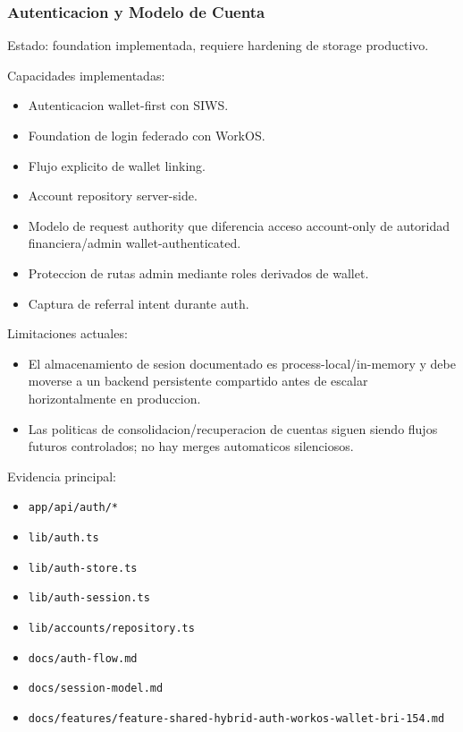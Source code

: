 \documentclass[
  10pt,
  letterpaper,
]{article}
\providecommand{\tightlist}{%
  \setlength{\itemsep}{0pt}\setlength{\parskip}{0pt}}
\let\oldtexttt\texttt
\renewcommand{\texttt}[1]{\oldtexttt{\small #1}}
\begin{document}
\subsubsection{Autenticacion y Modelo de
Cuenta}\label{autenticacion-y-modelo-de-cuenta}

Estado: foundation implementada, requiere hardening de storage
productivo.

Capacidades implementadas:

\begin{itemize}
\tightlist
\item
  Autenticacion wallet-first con SIWS.
\item
  Foundation de login federado con WorkOS.
\item
  Flujo explicito de wallet linking.
\item
  Account repository server-side.
\item
  Modelo de request authority que diferencia acceso account-only de
  autoridad financiera/admin wallet-authenticated.
\item
  Proteccion de rutas admin mediante roles derivados de wallet.
\item
  Captura de referral intent durante auth.
\end{itemize}

Limitaciones actuales:

\begin{itemize}
\tightlist
\item
  El almacenamiento de sesion documentado es process-local/in-memory y
  debe moverse a un backend persistente compartido antes de escalar
  horizontalmente en produccion.
\item
  Las politicas de consolidacion/recuperacion de cuentas siguen siendo
  flujos futuros controlados; no hay merges automaticos silenciosos.
\end{itemize}

Evidencia principal:

\begin{itemize}
\tightlist
\item
  \texttt{app/api/auth/*}
\item
  \texttt{lib/auth.ts}
\item
  \texttt{lib/auth-store.ts}
\item
  \texttt{lib/auth-session.ts}
\item
  \texttt{lib/accounts/repository.ts}
\item
  \texttt{docs/auth-flow.md}
\item
  \texttt{docs/session-model.md}
\item
  \texttt{docs/features/feature-shared-hybrid-auth-workos-wallet-bri-154.md}
\end{itemize}
\end{document}
